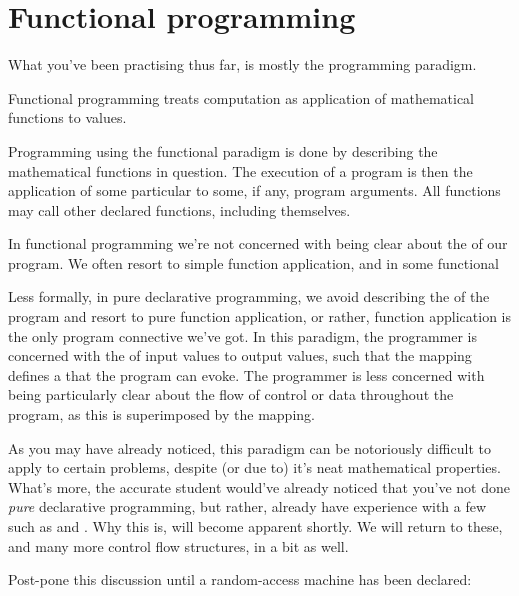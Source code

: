 \section{Functional programming}

What you've been practising thus far, is mostly the 
programming paradigm.

\begin{definition}

Functional programming treats computation as application of mathematical
functions to  values.

\end{definition}

Programming using the functional paradigm is done by describing the
mathematical functions in question. The execution of a program is then the
application of some particular  to some, if any, program
arguments. All functions may call other declared functions, including
themselves.



In functional programming we're not concerned with being clear about the  of our program. We often resort to simple function application, and in some functional 


Less formally, in pure declarative programming, we avoid describing the
 of the program and resort to pure function application, or rather,
function application is the only program connective we've got.  In this
paradigm, the programmer is concerned with the  of input values to
output values, such that the mapping defines a  that
the program can evoke.  The programmer is less concerned with being
particularly clear about the flow of control or data throughout the program, as
this is superimposed by the mapping.

As you may have already noticed, this paradigm can be notoriously difficult to
apply to certain problems, despite (or due to) it's neat mathematical
properties.  What's more, the accurate student would've already noticed that
you've not done \emph{pure} declarative programming, but rather, already have
experience with a few  such as  and
 .  Why this is, will become
apparent shortly. We will return to these, and many more control flow
structures, in a bit as well.

Post-pone this discussion until a random-access machine has been declared:

